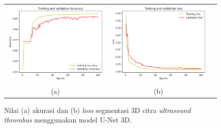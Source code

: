 \begin{figure}[htbp]
	\centering
	\begin{tabular}{ccc}
		\includegraphics[scale=0.5]{bab4/segmentasi 3D/acc_99,10783767700195.png} &
		\includegraphics[scale=0.5]{bab4/segmentasi 3D/loss_0,0208.png} & \\
		(a) & (b)    %
	\end{tabular}
	\caption{Nilai (a) akurasi dan (b) \textit{loss} segmentasi 3D citra \textit{ultrasound} \textit{thrombus} menggunakan model U-Net 3D.}
	\label{fig:performance-unet3d}
\end{figure}



